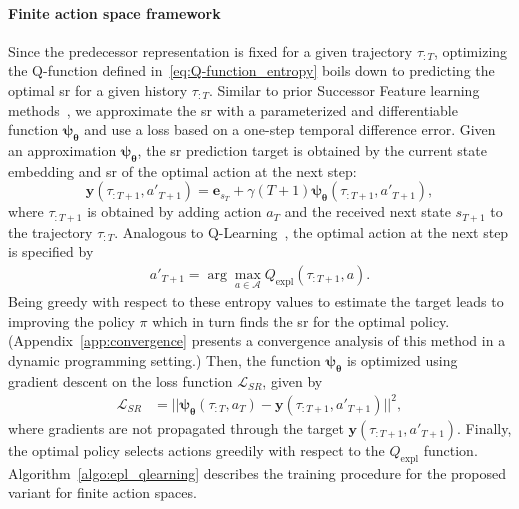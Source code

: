 \documentclass{article}
\theoremstyle{plain}
\theoremstyle{definition}
\theoremstyle{remark}
\begin{document}
\paragraph{Finite action space framework}
Since the predecessor representation is fixed for a given trajectory $\tau_{:T}$, optimizing the Q-function defined in~\autoref{eq:Q-function_entropy} boils down to predicting the optimal \gls{sr} for a given history $\tau_{:T}$. 
Similar to prior Successor Feature learning methods~\citep{barreto2017successor,barreto2018transfer,lehnert2017advantages}, we approximate the \gls{sr} with a parameterized and differentiable function $\pmb{\psi}_{\pmb{\theta}}$ and use a loss based on a one-step temporal difference error.
Given an approximation $\pmb{\psi}_{\pmb{\theta}}$, the \gls{sr} prediction target is obtained by the current state embedding and \gls{sr} of the optimal action at the next step:
\begin{equation}
    \pmb{y}(\tau_{:T+1},a'_{T+1}) = \pmb{e}_{s_{
T}} + \gamma(T+1) \pmb{\psi_{\theta}} (\tau_{:T+1}, a'_{T+1}),
\end{equation}
where $\tau_{:T+1}$ is obtained by adding action $a_T$ and the received next state $s_{T+1}$ to the trajectory $\tau_{:T}$. 
Analogous to Q-Learning~\cite{watkins1992qlearning}, the optimal action at the next step is specified by
\begin{align}
    \label{eq:optimal_policy}
    a'_{T+1}=\arg\max_{a \in \mathcal{A}} Q_{\text{expl}} (\tau_{:T+1}, a). 
\end{align}
Being greedy with respect to these entropy values to estimate the target leads to improving the policy $\pi$ which in turn finds the \gls{sr} for the optimal policy.
(Appendix~\ref{app:convergence} presents a convergence analysis of this method in a dynamic programming setting.)
Then, the function $\pmb{\psi}_{\pmb{\theta}}$ is optimized using gradient descent on the loss function $\mathcal{L}_{SR}$, given by
\begin{align}
    \label{eq:loss_sr}
    \mathcal{L}_{SR} &=  || \pmb{\psi}_{\pmb{\theta}} (\tau_{:T}, a_{T})  - \pmb{y}(\tau_{:T+1},a'_{T+1}) ||^2,
\end{align}
where gradients are not propagated through the target $\pmb{y}(\tau_{:T+1},a'_{T+1})$.
Finally, the optimal policy selects actions greedily with respect to the $Q_{\text{expl}}$ function. 
Algorithm~\ref{algo:epl_qlearning} describes the training procedure for the proposed variant for finite action spaces.
\end{document}

